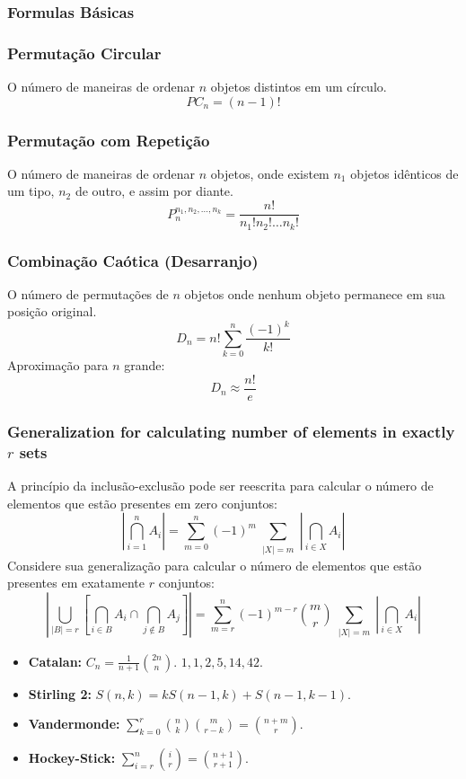 \subsubsection{Formulas Básicas}

\subsubsection*{Permutação Circular}
O número de maneiras de ordenar $n$ objetos distintos em um círculo.
$$ PC_n = (n-1)! $$

\subsubsection*{Permutação com Repetição}
O número de maneiras de ordenar $n$ objetos, onde existem $n_1$ objetos idênticos de um tipo, $n_2$ de outro, e assim por diante.
$$ P_n^{n_1, n_2, \dots, n_k} = \frac{n!}{n_1! n_2! \dots n_k!} $$

\subsubsection*{Combinação Caótica (Desarranjo)}
O número de permutações de $n$ objetos onde nenhum objeto permanece em sua posição original.
$$ D_n = n! \sum_{k=0}^{n} \frac{(-1)^k}{k!} $$
Aproximação para $n$ grande:
$$ D_n \approx \frac{n!}{e} $$

\subsubsection*{Generalization for calculating number of elements in exactly \( r \) sets}
A princípio da inclusão-exclusão pode ser reescrita para calcular o número de elementos que estão presentes em zero conjuntos:
\[
\left| \bigcap_{i=1}^{n} A_i \right| = \sum_{m=0}^{n} (-1)^m \sum_{\substack{|X|=m}} \left| \bigcap_{i \in X} A_i \right|
\]
Considere sua generalização para calcular o número de elementos que estão presentes em exatamente \( r \) conjuntos:
\[
\left| \bigcup_{|B|=r} \left[ \bigcap_{i \in B} A_i \cap \bigcap_{j \notin B} A_j \right] \right| = \sum_{m=r}^{n} (-1)^{m-r} \binom{m}{r} \sum_{\substack{|X|=m}} \left| \bigcap_{i \in X} A_i \right|
\]

\begin{itemize}[leftmargin=*, nosep]
    \item \textbf{Catalan:} $C_n = \frac{1}{n+1}\binom{2n}{n}$. $1, 1, 2, 5, 14, 42$.
    \item \textbf{Stirling 2:} $S(n,k) = k S(n-1, k) + S(n-1, k-1)$.
    \item \textbf{Vandermonde:} $\sum_{k=0}^r \binom{n}{k}\binom{m}{r-k} = \binom{n+m}{r}$.
    \item \textbf{Hockey-Stick:} $\sum_{i=r}^n \binom{i}{r} = \binom{n+1}{r+1}$.
\end{itemize}
